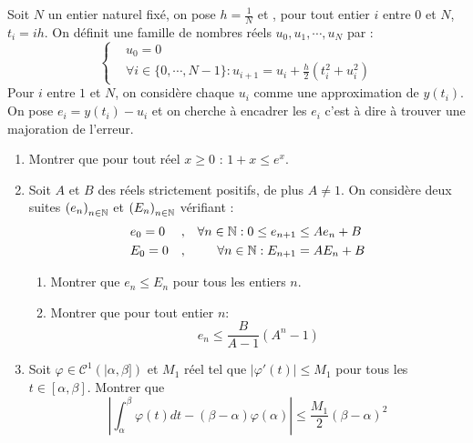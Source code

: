 Soit $N$ un entier naturel fixé, on pose $h = \frac{1}{N}$ et , pour tout entier $i$ entre $0$ et $N$, $t_i=ih$. On définit une famille de nombres réels $u_0,u_1,\cdots,u_N$ par :
\begin{displaymath}
 \left\lbrace 
\begin{aligned}
 & u_0 = 0 \\
&\forall i \in \{0,\cdots, N-1\} : u_{i+1} = u_i + \frac{h}{2}(t_i^2 + u_i^2)
\end{aligned}
\right. 
\end{displaymath}
Pour $i$ entre $1$ et $N$, on considère chaque $u_i$ comme une approximation de $y(t_i)$.\newline
 On pose $e_i=y(t_i)-u_i$ et on cherche à encadrer les $e_i$ c'est à dire à trouver une majoration de l'erreur.
\begin{enumerate}
 \item Montrer que pour tout réel $x\geq 0$ : $1+x \leq e^x$.
\item Soit $A$ et $B$ des réels strictement positifs, de plus $A\neq 1$. On considère deux suites $\left( e_n \right)_{n\in\mathbb{N}}$ et $\left( E_n \right)_{n\in\mathbb{N}}$ vérifiant :
\begin{displaymath}
 \begin{aligned}
&e_0 = 0 &,& &\forall n\in \mathbb{N} :  0\leq e_{n+1} &\leq Ae_n +B \\
&E_0 = 0 &,& &\forall n\in \mathbb{N} :  E_{n+1} &= AE_n +B 
 \end{aligned}
\end{displaymath}
\begin{enumerate}
 \item Montrer que $ e_n \leq E_n$ pour tous les entiers $n$.
 \item Montrer que pour tout entier $n$:
\begin{displaymath}
 e_n \leq \frac{B}{A-1}(A^n -1)
\end{displaymath}
\end{enumerate}

\item Soit $\varphi\in\mathcal C^1(|\alpha , \beta])$ et $M_1$ réel tel que $|\varphi'(t)|\leq M_1$ pour tous les $t\in [\alpha , \beta]$. Montrer que 
\begin{displaymath}
 \left \vert\int_\alpha ^\beta \varphi(t)dt - (\beta-\alpha)\varphi(\alpha)\right\vert
\leq \frac{M_1}{2}(\beta - \alpha)^2
\end{displaymath}


\end{enumerate}
